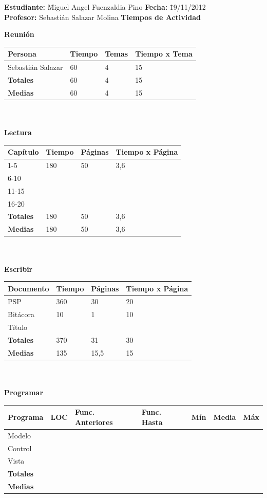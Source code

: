 \documentclass[a4paper,12pt,openany,oneside]{book}
\begin{document}
\begin{tabbing}
\textbf{Estudiante:} \= Miguel Angel Fuenzaldia Pino \= \textbf{Fecha:} \= 19/11/2012\\
\textbf{Profesor:} \> Sebastián Salazar Molina \> \textbf{Tiempos de Actividad} \>  \\
\end{tabbing}
\textbf{Reunión}\\
\begin{tabular}{| l | l | l | l |}
\hline
\textbf{Persona} & \textbf{Tiempo} & \textbf{Temas} & \textbf{Tiempo x Tema}\\
\hline
Sebastián Salazar & 60 & 4 & 15\\
\hline
\textbf{Totales} & 60 & 4 & 15 \\
\hline
\textbf{Medias} & 60 & 4 & 15 \\
\hline
\end{tabular}
\\\\
\textbf{Lectura}\\
\begin{tabular}{| l | l | l | l |}
\hline
\textbf{Capítulo} & \textbf{Tiempo} & \textbf{Páginas} & \textbf{Tiempo x Página}\\
\hline
1-5   & 180 & 50 & 3,6 \\
\hline
6-10  & & & \\
\hline
11-15 & & & \\
\hline
16-20 & & & \\
\hline
\textbf{Totales} & 180 & 50 & 3,6 \\
\hline
\textbf{Medias} & 180 & 50 & 3,6 \\
\hline
\end{tabular}
\\\\
\textbf{Escribir}\\
\begin{tabular}{| l | l | l | l |}
\hline
\textbf{Documento} & \textbf{Tiempo} & \textbf{Páginas} & \textbf{Tiempo x Página}\\
\hline
PSP & 360 & 30 & 20 \\
\hline
Bitácora & 10 & 1 & 10 \\
\hline
Título & & & \\
\hline
\textbf{Totales} & 370 & 31 & 30 \\
\hline
\textbf{Medias} & 135 & 15,5 & 15 \\
\hline
\end{tabular}
\\\\
\textbf{Programar}\\
\begin{tabular}{| l | l | l | l | l | l | l |}
\hline
\textbf{Programa} & \textbf{LOC} & \textbf{Func. Anteriores} & \textbf{Func. Hasta} & \textbf{Mín} & \textbf{Media} & \textbf{Máx}\\
\hline
Modelo & & & & & & \\
\hline
Control & & & & & & \\
\hline
Vista & & & & & & \\
\hline
\textbf{Totales} & & & & & & \\
\hline
\textbf{Medias} & & & & & & \\
\hline
\end{tabular}
\end{document}

